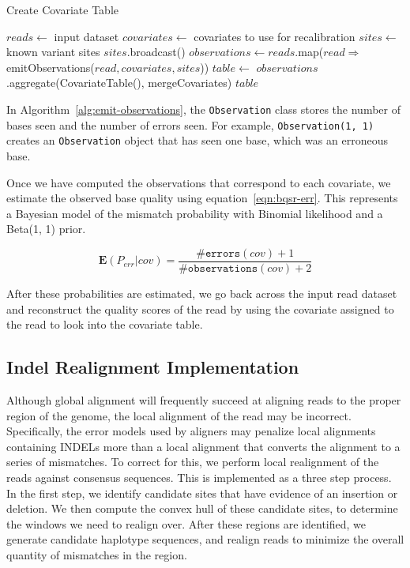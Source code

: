 \documentclass[masters]{ucbthesis}
\begin{document}
\begin{algorithm}
\caption{Create Covariate Table}
\label{alg:create-table}
\begin{algorithmic}
\STATE $reads \leftarrow$ input dataset
\STATE $covariates \leftarrow$ covariates to use for recalibration
\STATE $sites \leftarrow$ known variant sites
\STATE $sites$.broadcast()
\STATE $observations \leftarrow reads$.map($read \Rightarrow$ emitObservations($read, covariates, sites$))
\STATE $table \leftarrow$ $observations$.aggregate(CovariateTable(), mergeCovariates)
\RETURN $table$
\end{algorithmic}
\end{algorithm}

In Algorithm~\ref{alg:emit-observations}, the \texttt{Observation} class stores the number of bases seen
and the number of errors seen. For example, \texttt{Observation(1, 1)} creates an \texttt{Observation} object
that has seen one base, which was an erroneous base.

Once we have computed the observations that correspond to each covariate, we estimate the observed base
quality using equation~\eqref{eqn:bqsr-err}. This represents a Bayesian model of the mismatch probability with
Binomial likelihood and a Beta(1, 1) prior.

\begin{equation}
\label{eqn:bqsr-err}
\mathbf{E}(P_{err}|{cov}) = \frac{\texttt{\#errors}(cov) + 1}{\texttt{\#observations}(cov) + 2}
\end{equation}

After these probabilities are estimated, we go back across the input read dataset and reconstruct the quality
scores of the read by using the covariate assigned to the read to look into the covariate table.

\subsection{Indel Realignment Implementation}
\label{sec:indel-realignment-implementation}

Although global alignment will frequently succeed at aligning reads to the proper region of the genome, the local
alignment of the read may be incorrect. Specifically, the error models used by aligners may penalize local alignments
containing INDELs more than a local alignment that converts the alignment to a series of mismatches. To correct
for this, we perform local realignment of the reads against consensus sequences. This is implemented as a three step
process. In the first step, we identify candidate sites that have evidence of an insertion or deletion. We then compute
the convex hull of these candidate sites, to determine the windows we need to realign over. After these regions are
identified, we generate candidate haplotype sequences, and realign reads to minimize the overall quantity of mismatches
in the region.
\end{document}
